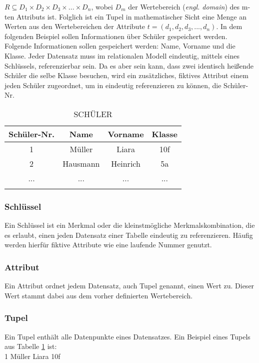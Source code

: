 \documentclass[12pt, a4paper, twoside]{article}
\begin{document}
		$ R  \subseteq D_{1 } \times D_{2 } \times D_{3 }  \times...\times D_{n}$, wobei $D_{m}$ der Wertebereich (\textit{engl. domain}) des m-ten Attributs ist.
		Folglich ist ein Tupel in mathematischer Sicht eine Menge an Werten aus den Wertebereichen der Attribute $t=(d_{1}, d_{2}, d_{3}, ...,d_{n} )$.
		\cite{Meier:SQLNoSQLDatenbanken}
		In dem folgenden Beispiel sollen Informationen über Schüler gespeichert werden. Folgende Informationen sollen gespeichert werden: Name, Vorname und die Klasse. Jeder Datensatz muss im relationalen Modell eindeutig, mittels eines Schlüssels, referenzierbar sein. Da es aber sein kann, dass zwei identisch heißende Schüler die selbe Klasse besuchen, wird ein zusätzliches, fiktives Attribut einem jeden Schüler zugeordnet, um in eindeutig referenzieren zu können, die Schüler-Nr.
		\begin{longtable}{|c|c|c|c|}
			\hline
			Schüler-Nr. & Name & Vorname & Klasse \\
			\hline
			1 & Müller & Liara & 10f \\
			\hline
			2 & Hausmann & Heinrich & 5a \\
			\hline
			... & ... & ... & ... \\
			\hline
			\caption{SCHÜLER}
			\label{table:Schüler}
		\end{longtable}
	\cite{Meier:SQLNoSQLDatenbanken}
	
	\subsubsection{Schlüssel}
	Ein Schlüssel ist ein Merkmal oder die kleinstmögliche Merkmalskombination, die es erlaubt, einen jeden Datensatz einer Tabelle eindeutig zu referenzieren. Häufig werden hierfür fiktive Attribute wie eine laufende Nummer genutzt.
	\subsubsection{Attribut}
	Ein Attribut ordnet jedem Datensatz, auch Tupel genannt, einen Wert zu. Dieser Wert stammt dabei aus dem vorher definierten Wertebereich.
	\subsubsection{Tupel}
	Ein Tupel enthält alle Datenpunkte eines Datensatzes. Ein Beispiel eines Tupels aus Tabelle \ref{table:Schüler} ist:\\
	1	Müller	Liara	10f
\end{document}
